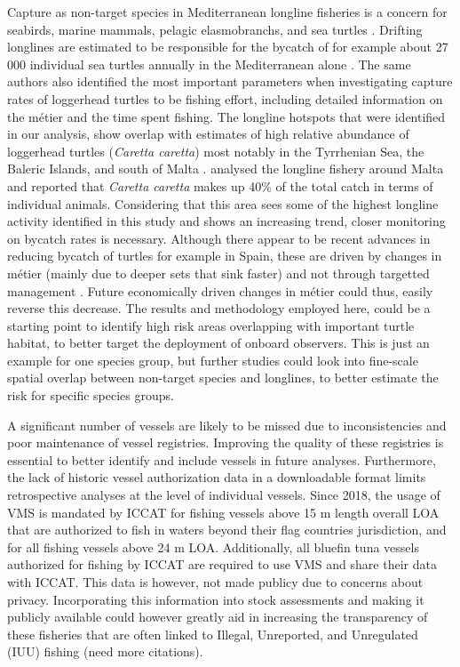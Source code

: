 \medskip

Capture as non-target species in Mediterranean longline fisheries is a concern for seabirds, marine
mammals, pelagic elasmobranchs, and sea turtles
\citep{spain_swo_gear,mammal_bycatch,shark_bycatch,baez_turtles_bycatch,bycatch_book}. Drifting
longlines are estimated to be responsible for the bycatch of for example about 27 000 individual
sea turtles annually in the Mediterranean alone \citep{bycatch_book}. The same authors also
identified the most important parameters when investigating capture rates of loggerhead turtles to
be fishing effort, including detailed information on the métier and the time spent fishing. The
longline hotspots that were identified in our analysis, show overlap with estimates of high
relative abundance of loggerhead turtles (\textit{Caretta caretta}) most notably in the Tyrrhenian
Sea, the Baleric Islands, and south of Malta \citep{dimatteo_turtles,bycatch_malta}.
\cite{bycatch_malta} analysed the longline fishery around Malta and reported that \textit{Caretta
	caretta} makes up 40\% of the total catch in terms of individual animals. Considering that this
area sees some of the highest longline activity identified in this study and shows an increasing
trend, closer monitoring on bycatch rates is necessary. Although there appear to be recent advances
in reducing bycatch of turtles for example in Spain, these are driven by changes in métier (mainly
due to deeper sets that sink faster) and not through targetted management
\citep{baez_turtles_spain}. Future economically driven changes in métier could thus, easily reverse
this decrease. The results and methodology employed here, could be a starting point to identify
high risk areas overlapping with important turtle habitat, to better target the deployment of
onboard observers. This is just an example for one species group, but further studies could look
into fine-scale spatial overlap between non-target species and longlines, to better estimate the
risk for specific species groups.

\medskip

A significant number of vessels are likely to be missed due to inconsistencies and poor maintenance
of vessel registries. Improving the quality of these registries is essential to better identify and
include vessels in future analyses. Furthermore, the lack of historic vessel authorization data in
a downloadable format limits retrospective analyses at the level of individual vessels. Since 2018,
the usage of VMS is mandated by ICCAT for fishing vessels above 15 m length overall LOA that are
authorized to fish in waters beyond their flag countries jurisdiction, and for all fishing vessels
above 24 m LOA. Additionally, all bluefin tuna vessels authorized for fishing by ICCAT are required
to use VMS and share their data with ICCAT. This data is however, not made publicy due to concerns
about privacy. Incorporating this information into stock assessments and making it publicly
available could however greatly aid in increasing the transparency of these fisheries that are
often linked to Illegal, Unreported, and Unregulated (IUU) fishing \citep{iccat_bft_summary} (need
more citations).

